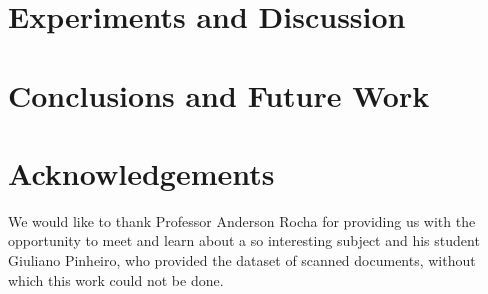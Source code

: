 \documentclass[10pt,twocolumn,letterpaper]{article}
\begin{document}
\section{Experiments and Discussion}
\label{sec:experiments}
\section{Conclusions and Future Work}
\label{sec:conclusions}

\section{Acknowledgements}
\label{sec:acknownledgements}

We would like to thank Professor Anderson Rocha for providing us with the opportunity to meet and learn about a so interesting subject and his student Giuliano Pinheiro, who provided the dataset of scanned documents, without which this work could not be done.

{\small


}
\end{document}
